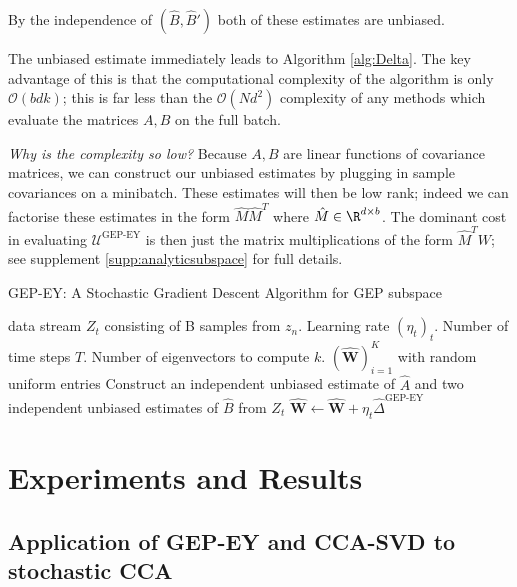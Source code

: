 By the independence of $(\hat{B},\hat{B}')$ both of these estimates are unbiased.

The unbiased estimate immediately leads to Algorithm \ref{alg:Delta}.
The key advantage of this is that the computational complexity of the algorithm is only $\mathcal{O}(b d k)$; this is far less than the $\mathcal{O}(N d^2)$ complexity of any methods which evaluate the matrices $A,B$ on the full batch.

\textit{Why is the complexity so low?} Because $A,B$ are linear functions of covariance matrices, we can construct our unbiased estimates by plugging in sample covariances on a minibatch.
These estimates will then be low rank; indeed we can factorise these estimates in the form $\hat{M} \hat{M}^T$ where $\hat{M} \in \R^{d \times b}$. The dominant cost in evaluating $\mathcal{U}^\text{GEP-EY}$ is then just the matrix multiplications of the form $\hat{M}^T W$; see supplement \ref{supp:analyticsubspace} for full details.

\begin{algorithm}
   \caption{GEP-EY: A Stochastic Gradient Descent Algorithm for GEP subspace}
   \label{alg:Delta}
\begin{algorithmic}
    data stream $Z_t$ consisting of B samples from $z_n$. Learning rate $(\eta_t)_t$. Number of time steps $T$. Number of eigenvectors to compute $k$.
    $(\hat{\mathbf {W}})_{i=1}^K$ with random uniform entries
       \STATE Construct an independent unbiased estimate of $\hat{A}$ and two independent unbiased estimates of $\hat{B}$ from $Z_t$
        \STATE $\hat{\mathbf {W}} \leftarrow \hat{\mathbf {W}}+\eta_{t} \hat{\Delta}^{\text{GEP-EY}}$ 
   \ENDFOR
\end{algorithmic}
\end{algorithm}

\section{Experiments and Results}

\subsection{Application of GEP-EY and CCA-SVD to stochastic CCA}

